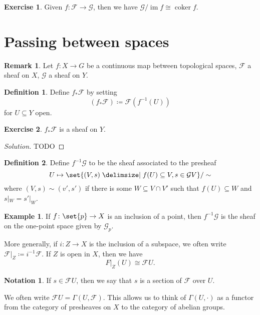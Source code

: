 \documentclass[a4paper]{amsbook}
\theoremstyle{definition}
\newtheorem{notation}[definition]{Notation}
\newtheorem*{definition*}{Definition}
\newtheorem*{remark*}{Remark}
\newtheorem*{example*}{Example}
\newtheorem*{exercise*}{Exercise}
\DeclareMathOperator\coker{coker}
\DeclareMathOperator\im{im}
\begin{document}
\begin{exercise*}
\label{ImCoker}
Given $f\colon \mathcal{F}\to \mathcal{G}$, then we have $\mathcal{G}/\im f\cong \coker f$.
\end{exercise*}

\section{Passing between spaces}
\label{PassingBetweenSpaces}
\begin{remark*}
\label{Intro}
Let $f\colon X\to G$ be a continuous map between topological spaces, $\mathcal{F}$ a sheaf on
$X$, $\mathcal{G}$ a sheaf on $Y$.
\end{remark*}

\begin{definition*}
\label{PushforwardSheaf}
Define $f_*\mathcal{F}$ by setting
\[ (f_*\mathcal{F})\coloneqq \mathcal{F}(f^{-1}(U)) \]
for $U \subseteq Y$ open.
\end{definition*}

\begin{exercise*}
\label{PushforwardSheafVer}
$f_*\mathcal{F}$ is a sheaf on $Y$.
\end{exercise*}
\begin{proof}[Solution]
TODO
\end{proof}

\begin{definition*}
\label{PullbackSheaf}
Define  $f^{-1}\mathcal{G}$ to be the sheaf associated to the presheaf
\[ U\mapsto \set{(V, s)\given f(U) \subseteq V, s \in \mathcal{G}V}/\sim \]
where $(V, s)\sim (v', s')$ if there is some $W \subseteq V\cap V'$ such that
$f(U) \subseteq W$ and $s|_W = s'|_W$.
\end{definition*}

\begin{example*}
\label{Examples}
If $f\colon \set{p} \to X$ is an inclusion of a point, then $f^{-1}\mathcal{G}$ is the
sheaf on the one-point space given by $\mathcal{G}_p$.

More generally, if $i\colon Z\to X$ is the inclusion of a subspace, we often write
$\mathcal{F}|_Z\coloneqq i^{-1}\mathcal{F}$. If $Z$ is open in $X$, then we have
\[ F|_Z(U) \cong \mathcal{F}U. \]
\end{example*}

\begin{notation}
\label{Sections}
If $s \in \mathcal{F}U$, then we say that $s$ is a section of $\mathcal{F}$ over $U$.

We often write $\mathcal{F}U = \Gamma(U, \mathcal{F})$. This allows us to think
of $\Gamma(U, \cdot)$ as a functor from the category of presheaves on $X$ to the
category of abelian groups.
\end{notation}
\end{document}
